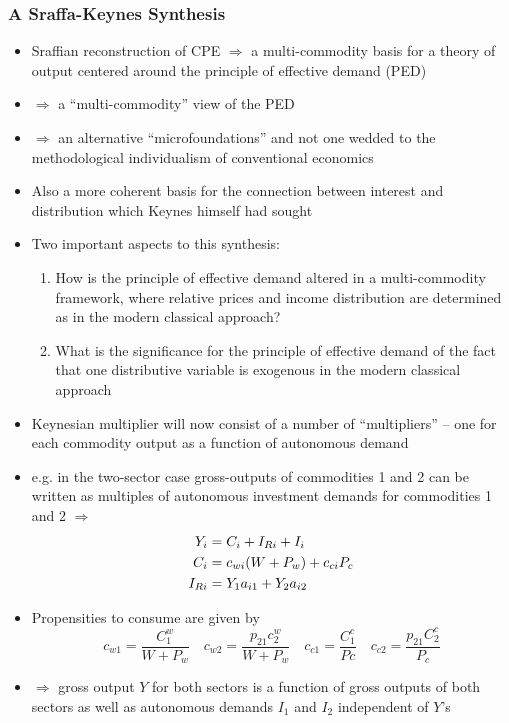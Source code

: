 \documentclass[a4paper,twoside]{article}
\numberwithin{equation}{section}
\numberwithin{figure}{section}
\begin{document}
\subsubsection{A Sraffa-Keynes Synthesis}
	\begin{itemize}
		\item Sraffian reconstruction of CPE \( \Rightarrow \) a multi-commodity basis for a theory of output centered around the principle of effective demand (PED)
		\item \( \Rightarrow \) a ``multi-commodity'' view of the PED
		\item \( \Rightarrow \) an alternative ``microfoundations'' and not one wedded to the methodological individualism of conventional economics
		\item Also a more coherent basis for the connection between interest and distribution which Keynes himself had sought
		\item Two important aspects to this synthesis:
		\begin{enumerate}[label=\textbf{\arabic*.}]
			\item How is the principle of effective demand altered in a multi-commodity framework, where relative prices and income distribution are determined as in the modern classical approach?
			\item What is the significance for the principle of effective demand of the fact that one distributive variable is exogenous in the modern classical approach
		\end{enumerate}
		\item Keynesian multiplier will now consist of a number of ``multipliers'' -- one for each commodity output as a function of autonomous demand
		\item e.g. in the two-sector case gross-outputs of commodities 1 and 2 can be written as multiples of autonomous investment demands for commodities 1 and 2 \( \Rightarrow \)
		\begin{align}
			Y_i &= C_i+I_{Ri}+I_i \notag\\
			C_i &= c_{wi}(W+P_w)+c_{ci}P_c\\
			I_{Ri} &= Y_1a_{i1}+Y_2a_{i2} \notag
		\end{align}
		\item Propensities to consume are given by
		\[
			c_{w1} = \frac{C_1^w}{W+P_w} \quad c_{w2}=\frac{p_{21}c_2^w}{W+P_w} \quad c_{c1}=\frac{C_1^c}{Pc} \quad c_{c2}=\frac{p_{21}C_2^c}{P_c}
		\]
		\item \( \Rightarrow \) gross output \( Y \) for both sectors is a function of gross outputs of both sectors as well as autonomous demands \( I_1 \) and \( I_2 \) independent of \( Y \)'s

\end{itemize}
\end{document}
